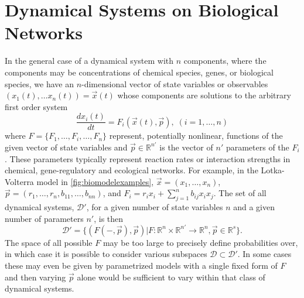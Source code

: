 \section{Dynamical Systems on Biological Networks}

In the general case of a dynamical system with $n$ components, where the components may be concentrations of chemical species, genes, or biological species, we have an $n$-dimensional vector of state variables or observables $(x_1(t), \ldots x_n(t)) = \vec{x}(t)
$
whose components are solutions to the arbitrary first order system
\begin{equation}\label{eq:eom}
\frac{dx_i(t)}{dt} = F_i(\vec{x}(t), \vec{p}), \; (i=1,\ldots,n)
\end{equation}
where $F=\{F_1,\ldots,F_i,\ldots,F_n\}$ represent, potentially nonlinear, functions of the given vector of state variables and $\vec{p} \in \mathbb{R}^{n'}$ is the vector of $n'$ parameters of the $F_i$. These parameters typically represent reaction rates or interaction strengths in chemical, gene-regulatory and ecological networks. For example, in the Lotka-Volterra model in \ref{fig:biomodelexamples}, $\vec{x} = (x_1, \ldots, x_n)$, $\vec{p}=(r_1,\ldots,r_n,b_{11},\ldots,b_{nn})$, and $F_i = r_i x_i + \sum_{j=1}^{n} b_{ij} x_i x_j$. The set of all dynamical systems, $\mathcal{D}'$, for a given number of state variables $n$ and a given number of parameters $n'$, is then
\begin{equation}\label{eq:setdynsys}
\mathcal{D}' = \{ (F(-,\vec{p}),\vec{p}) | F \colon \mathbb{R}^n \times \mathbb{R}^{n'} \rightarrow \mathbb{R}^n, \vec{p} \in \mathbb{R}^s \}.
\end{equation}
The space of all possible $F$ may be too large to precisely define probabilities over, in which case it is possible to consider various subspaces $\mathcal{D} \subset \mathcal{D}'$. In some cases these may even be given by parametrized models with a single fixed form of $F$ and then varying $\vec{p}$ alone would be sufficient to vary within that class of dynamical systems.

